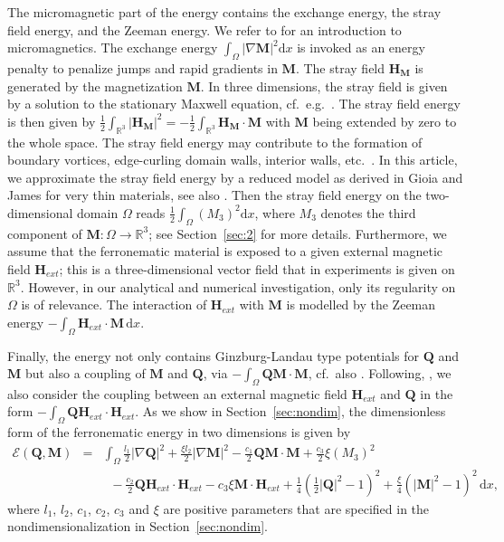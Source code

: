 \documentclass{article}
\def\Qvec{\mathbf{Q}}
\def \Mvec{\mathbf{M}}
\def\Hvec{\mathbf{H}}
\def\d{\mathrm{d}}
\begin{document}
The micromagnetic part of the energy contains the exchange energy, the stray field energy, and the Zeeman energy. We refer to \cite{brown1966magnetoelastic, hubert2008magnetic,kruzikprohl} for an introduction to micromagnetics.  The exchange energy $\int_{\Omega}|\nabla\Mvec|^2\mathrm{d}x$ is invoked as an energy penalty to penalize jumps and rapid gradients in $\Mvec$.   
 The stray field $\Hvec_{\Mvec}$ is generated by the magnetization $\Mvec$. In three dimensions, the stray field is given by a solution to the stationary Maxwell equation, cf.\ e.g.\ \cite{kruzikprohl}. The stray field energy  is then given by $\frac{1}{2}\int_{\mathbb{R}^3} |\Hvec_\Mvec|^2 = -\frac{1}{2}\int_{\mathbb{R}^3} \Hvec_{\Mvec} \cdot \Mvec$ with $\Mvec$ being extended by zero to the whole space. The stray field energy may contribute to the formation of boundary vortices, edge-curling domain walls, interior walls, etc.~\cite{desimone2004recent}. 
 In this article, we approximate the stray field energy by a reduced model as derived in Gioia and James \cite{Giogia} for very thin materials, see also \cite[Sec.~10]{desimone2004recent,Garcia2004}. Then the stray field energy on the two-dimensional domain $\Omega$ reads $\frac{1}{2}\int_{\Omega}\left(M_3\right)^2\d x$, where $M_3$ denotes the third component of $\Mvec:\Omega\to \mathbb{R}^3$; see Section~\ref{sec:2} for more details.
Furthermore, we assume that the ferronematic material is exposed to a given external magnetic field $\Hvec_{ext}$; this is a three-dimensional vector field that in experiments is given on $\mathbb R^3$. However, in our analytical and numerical investigation, only its regularity on $\Omega$ is of relevance. The interaction of $\Hvec_{ext}$ with $\Mvec$ is modelled by the Zeeman energy $-\int_{\Omega}\Hvec_{ext}\cdot\Mvec\, \d x$. 

Finally, the energy not only contains Ginzburg-Landau type potentials for $\Qvec$ and  $\Mvec$ but also a coupling of $\Mvec$ and $\Qvec$, via $-\int_\Omega \Qvec \Mvec \cdot \Mvec$, cf.\ also \cite{Pleiner}. Following, \cite{Calderer, Mertelj}, we also consider the coupling between an external magnetic field $\Hvec_{ext}$ and $\Qvec$ in the form $-\int_\Omega \Qvec \Hvec_{ext} \cdot \Hvec_{ext}$. 
As we show in Section~\ref{sec:nondim}, the dimensionless form of the ferronematic energy  in two dimensions is given by 
\begin{eqnarray}\label{en:2}
\mathcal{E}\left(\Qvec, \Mvec\right)&=&\int_{\Omega}\frac{l_1}{2}|\nabla \Qvec|^2 + \frac{\xi l_2}{2}|\nabla \Mvec|^2 - \frac{c_1}{2}\Qvec\Mvec\cdot\Mvec 
+ \frac{c_3}{2}\xi\left(M_3\right)^2
\nonumber\\
&& \;\;- \frac{c_2}{2}\Qvec\Hvec_{ext}\cdot\Hvec_{ext} 
- c_3\xi\Mvec\cdot\Hvec_{ext} + \frac{1}{4}\left(\frac{1}{2}|\Qvec|^2 - 1\right)^2 + \frac{\xi}{4}\left(|\Mvec|^2 - 1\right)^2 \,\d x,
\end{eqnarray}
where
$l_1$, $l_2$, $c_1$, $c_2$, $c_3$ and $\xi$ are  positive parameters that are specified in the nondimensionalization in Section~\ref{sec:nondim}.  
\end{document}

